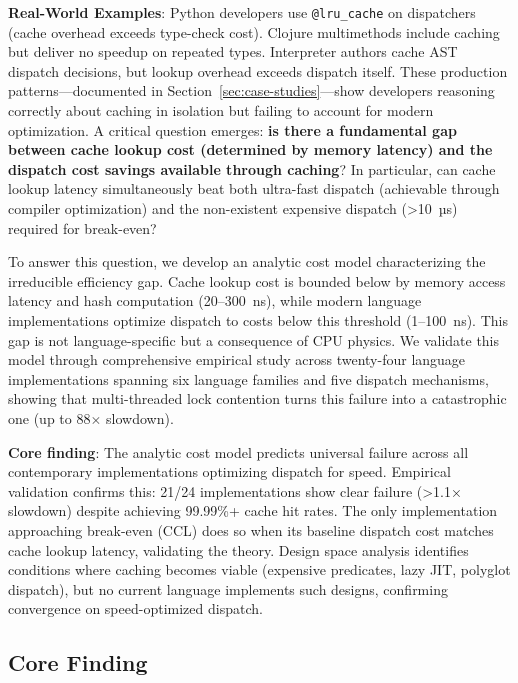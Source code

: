 \documentclass[sigplan,final,acmsmall,review,screen]{acmart}
\begin{document}
\textbf{Real-World Examples}: Python developers use \texttt{@lru\_cache} on dispatchers (cache overhead exceeds type-check cost). Clojure multimethods include caching but deliver no speedup on repeated types. Interpreter authors cache AST dispatch decisions, but lookup overhead exceeds dispatch itself. These production patterns—documented in Section~\ref{sec:case-studies}—show developers reasoning correctly about caching in isolation but failing to account for modern optimization. A critical question emerges: \textbf{is there a fundamental gap between cache lookup cost
  (determined by memory latency) and the dispatch cost savings available through caching}? In particular, can cache lookup latency simultaneously
  beat both ultra-fast dispatch (achievable through compiler optimization) and the non-existent expensive dispatch (>10~µs) required for break-even?

  To answer this question, we develop an analytic cost model characterizing the irreducible efficiency gap. Cache lookup cost is bounded below
  by memory access latency and hash computation (20--300~ns), while modern language implementations optimize dispatch to costs below this threshold
  (1--100~ns). This gap is not language-specific but a consequence of CPU physics. We validate this model through comprehensive empirical study
  across twenty-four language implementations spanning six language families and five dispatch mechanisms, showing that multi-threaded lock contention turns this failure into a catastrophic one (up to 88$\times$ slowdown).

  \textbf{Core finding}: The analytic cost model predicts universal failure across all contemporary implementations optimizing dispatch for speed.
Empirical validation confirms this: 21/24 implementations show clear failure (>1.1× slowdown) despite achieving 99.99\%+ cache hit rates.
The only implementation approaching break-even (CCL) does so when its baseline dispatch cost matches cache lookup latency,
validating the theory. Design space analysis identifies conditions where caching becomes viable (expensive predicates, lazy JIT, polyglot dispatch),
but no current language implements such designs, confirming convergence on speed-optimized dispatch.

\subsection{Core Finding}
\end{document}
